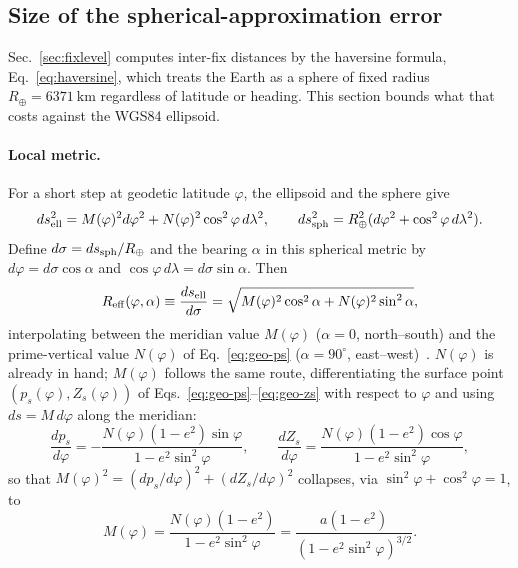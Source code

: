 \begin{revblock}
\section{Size of the spherical-approximation error}
\label{app:geodesy-flatscale}

Sec.~\ref{sec:fixlevel} computes inter-fix distances by the haversine formula,
Eq.~\eqref{eq:haversine}, which treats the Earth as a sphere of fixed radius
$R_\oplus=\SI{6371}{\kilo\metre}$ regardless of latitude or heading. This section bounds
what that costs against the WGS84 ellipsoid.

\paragraph{Local metric.}
For a short step at geodetic latitude $\varphi$, the ellipsoid and the sphere give
\begin{equation}
 ds_{\rm ell}^2=M(\varphi)^2d\varphi^2+
 N(\varphi)^2\cos^2\varphi\,d\lambda^2,\qquad
 ds_{\rm sph}^2=R_\oplus^2(d\varphi^2+\cos^2\varphi\,d\lambda^2).
\end{equation}
Define $d\sigma=ds_{\rm sph}/R_\oplus$ and the bearing $\alpha$ in this
spherical metric by $d\varphi=d\sigma\cos\alpha$ and
$\cos\varphi\,d\lambda=d\sigma\sin\alpha$. Then
\begin{equation}
\label{eq:geo-euler}
 R_{\rm eff}(\varphi,\alpha)\equiv\frac{ds_{\rm ell}}{d\sigma}
 =\sqrt{M(\varphi)^2\cos^2\alpha+N(\varphi)^2\sin^2\alpha},
\end{equation}
interpolating between the meridian value $M(\varphi)$ ($\alpha=0$, north--south) and the
prime-vertical value $N(\varphi)$ of Eq.~\eqref{eq:geo-ps} ($\alpha=90^\circ$,
east--west)~\cite{nga_wgs84}. $N(\varphi)$ is already in hand; $M(\varphi)$ follows the
same route, differentiating the surface point $(p_s(\varphi),Z_s(\varphi))$ of
Eqs.~\eqref{eq:geo-ps}--\eqref{eq:geo-zs} with respect to $\varphi$ and using
$ds=M\,d\varphi$ along the meridian:
\begin{equation}
\frac{dp_s}{d\varphi}=-\frac{N(\varphi)(1-e^2)\sin\varphi}{1-e^2\sin^2\varphi},\qquad
\frac{dZ_s}{d\varphi}=\frac{N(\varphi)(1-e^2)\cos\varphi}{1-e^2\sin^2\varphi},
\end{equation}
so that $M(\varphi)^2=(dp_s/d\varphi)^2+(dZ_s/d\varphi)^2$ collapses, via
$\sin^2\varphi+\cos^2\varphi=1$, to
\begin{equation}
\label{eq:geo-M}
M(\varphi)=\frac{N(\varphi)(1-e^2)}{1-e^2\sin^2\varphi}=\frac{a(1-e^2)}{(1-e^2\sin^2\varphi)^{3/2}}.
\end{equation}


\end{revblock}
